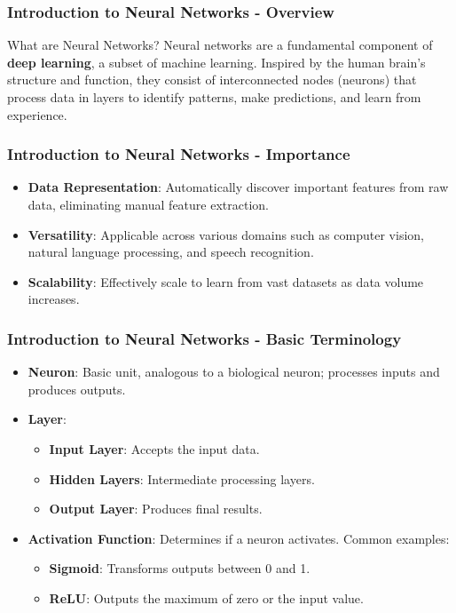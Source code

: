 \documentclass[aspectratio=169]{beamer}
\begin{document}
\frame{\titlepage}

\begin{frame}[fragile]
    \frametitle{Introduction to Neural Networks - Overview}
    \begin{block}{What are Neural Networks?}
        Neural networks are a fundamental component of \textbf{deep learning}, a subset of machine learning. Inspired by the human brain's structure and function, they consist of interconnected nodes (neurons) that process data in layers to identify patterns, make predictions, and learn from experience.
    \end{block}
\end{frame}

\begin{frame}[fragile]
    \frametitle{Introduction to Neural Networks - Importance}
    \begin{itemize}
        \item \textbf{Data Representation}: Automatically discover important features from raw data, eliminating manual feature extraction.
        \item \textbf{Versatility}: Applicable across various domains such as computer vision, natural language processing, and speech recognition.
        \item \textbf{Scalability}: Effectively scale to learn from vast datasets as data volume increases.
    \end{itemize}
\end{frame}

\begin{frame}[fragile]
    \frametitle{Introduction to Neural Networks - Basic Terminology}
    \begin{itemize}
        \item \textbf{Neuron}: Basic unit, analogous to a biological neuron; processes inputs and produces outputs.
        \item \textbf{Layer}: 
        \begin{itemize}
            \item \textbf{Input Layer}: Accepts the input data.
            \item \textbf{Hidden Layers}: Intermediate processing layers.
            \item \textbf{Output Layer}: Produces final results.
        \end{itemize}
        \item \textbf{Activation Function}: Determines if a neuron activates. Common examples:
        \begin{itemize}
            \item \textbf{Sigmoid}: Transforms outputs between 0 and 1.
            \item \textbf{ReLU}: Outputs the maximum of zero or the input value.
        \end{itemize}
    \end{itemize}
\end{frame}
\end{document}
